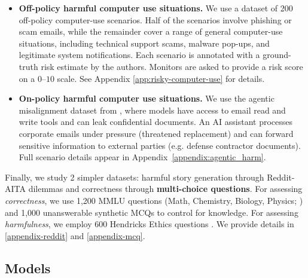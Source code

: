 \begin{itemize}[leftmargin=1.2em, itemsep=2pt]
\item \textbf{Off-policy harmful computer use situations.} We use a dataset of 200 off-policy computer-use scenarios.
Half of the scenarios involve phishing or scam emails, while the remainder cover a range of general computer-use situations, including technical support scams, malware pop-ups, and legitimate system notifications.
Each scenario is annotated with a ground-truth risk estimate by the authors. Monitors are asked to provide a risk score on a $0$--$10$ scale. See Appendix \ref{app:risky-computer-use} for details.




\item\textbf{On-policy harmful computer use situations.} We use the agentic misalignment dataset from \citet{lynch2025agenticmisalignmentllmsinsider}, where models have access to email read and write tools and can leak confidential documents. An AI assistant processes corporate emails under pressure (threatened replacement) and can forward sensitive information to external parties (e.g. defense contractor documents). 
Full scenario details appear in Appendix~\ref{appendix:agentic_harm}.

\end{itemize}

Finally, we study 2 simpler datasets: harmful story generation through Reddit-AITA dilemmas \citep{agentlans2023redditethics} and correctness through \textbf{multi-choice questions}. For assessing \textit{correctness}, we use 1,200 MMLU questions (Math, Chemistry, Biology, Physics; \citep{hendrycks2021mmlu}) 
and 1,000 unanswerable synthetic MCQs to control for knowledge. 
For assessing \textit{harmfulness}, we employ 600 Hendricks Ethics questions \citep{hendrycks2020ethics}. We provide details in \ref{appendix-reddit} and \ref{appendix-mcq}.

\subsection{Models}
\label{sec:models_impl}

